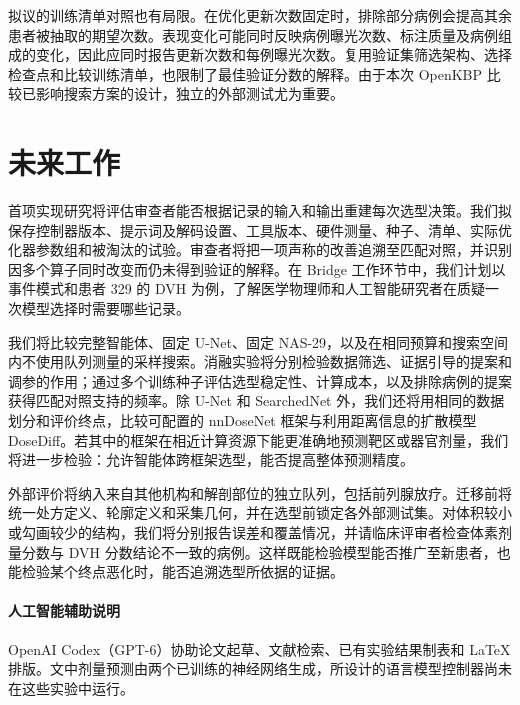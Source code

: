 \documentclass[UTF8,letterpaper,twocolumn,11pt,fontset=fandol]{ctexart}
\begin{document}
拟议的训练清单对照也有局限。在优化更新次数固定时，排除部分病例会提高其余患者被抽取的期望次数。表现变化可能同时反映病例曝光次数、标注质量及病例组成的变化，因此应同时报告更新次数和每例曝光次数。复用验证集筛选架构、选择检查点和比较训练清单，也限制了最佳验证分数的解释。由于本次 OpenKBP 比较已影响搜索方案的设计，独立的外部测试尤为重要。

\section{未来工作}
首项实现研究将评估审查者能否根据记录的输入和输出重建每次选型决策。我们拟保存控制器版本、提示词及解码设置、工具版本、硬件测量、种子、清单、实际优化器参数组和被淘汰的试验。审查者将把一项声称的改善追溯至匹配对照，并识别因多个算子同时改变而仍未得到验证的解释。在 Bridge 工作环节中，我们计划以事件模式和患者 329 的 DVH 为例，了解医学物理师和人工智能研究者在质疑一次模型选择时需要哪些记录。

我们将比较完整智能体、固定 U-Net、固定 NAS-29，以及在相同预算和搜索空间内不使用队列测量的采样搜索。消融实验将分别检验数据筛选、证据引导的提案和调参的作用；通过多个训练种子评估选型稳定性、计算成本，以及排除病例的提案获得匹配对照支持的频率。除 U-Net 和 SearchedNet 外，我们还将用相同的数据划分和评价终点，比较可配置的 nnDoseNet 框架与利用距离信息的扩散模型 DoseDiff\citep{nndose,dosediff}。若其中的框架在相近计算资源下能更准确地预测靶区或器官剂量，我们将进一步检验：允许智能体跨框架选型，能否提高整体预测精度。

外部评价将纳入来自其他机构和解剖部位的独立队列，包括前列腺放疗。迁移前将统一处方定义、轮廓定义和采集几何，并在选型前锁定各外部测试集。对体积较小或勾画较少的结构，我们将分别报告误差和覆盖情况，并请临床评审者检查体素剂量分数与 DVH 分数结论不一致的病例。这样既能检验模型能否推广至新患者，也能检验某个终点恶化时，能否追溯选型所依据的证据。

\paragraph{人工智能辅助说明} OpenAI Codex（GPT-6）协助论文起草、文献检索、已有实验结果制表和 LaTeX 排版。文中剂量预测由两个已训练的神经网络生成，所设计的语言模型控制器尚未在这些实验中运行。


\end{document}
